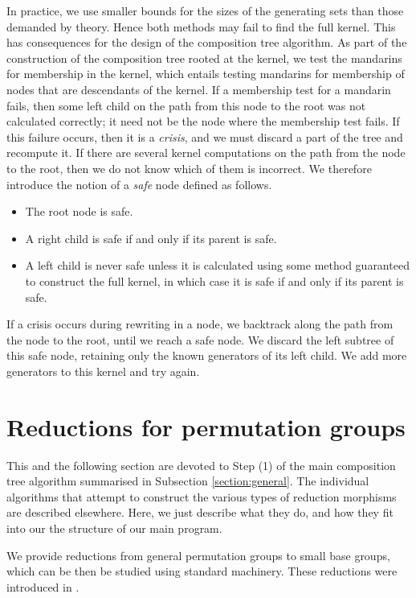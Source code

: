 \documentclass[12pt,twoside,reqno,psamsfonts]{amsproc}
\newcommand{\comment}[1]{\marginpar{\begin{center}\scriptsize{#1}\end{center}}}
\numberwithin{equation}{section}
\numberwithin{figure}{section}
\newcounter{algorithm}
\theoremstyle{plain}
\theoremstyle{definition}
\theoremstyle{remark}
\begin{document}
In practice, we use smaller bounds for the sizes of the 
generating sets than those demanded by theory. 
Hence both methods may fail to find the full kernel. This has
consequences for the design of the composition tree algorithm.
As part of the construction of the composition
tree rooted at the kernel, we test the mandarins for membership in the kernel, 
which entails testing mandarins for membership of nodes that
are descendants of the kernel.
If a membership test for a mandarin fails, 
then some left child on the path from this node to the root was
not calculated correctly; it need not be the 
node where the membership test fails.
If this failure occurs, then it is a \emph{crisis},
and we must discard a part of the tree and recompute it.
If there are several kernel computations on the path from the node
to the root, then we do not know which of them is incorrect. We
therefore introduce the notion of a \emph{safe} node defined as follows.
\begin{itemize}
\item The root node is safe.
\item A right child is safe if and only if its parent is safe.
\item A left child is never safe unless it is calculated using some
  method guaranteed to construct the full kernel, in which case it is safe if and only if its parent is safe.
\end{itemize}
If a crisis occurs during rewriting in a node, we 
backtrack along the path from the node to the root, until we reach a
safe node. We discard the left subtree of this safe node, 
retaining only the known generators of its left child. We add more
generators to this kernel and try again.

\section{Reductions for permutation groups}
\label{section:perm_reductions}
This and the following section are devoted to Step (1) of the main composition
\comment{DFH: added paragraph}
tree algorithm summarised in Subsection \ref{section:general}.
The individual algorithms that attempt to construct the various types of
reduction morphisms are described elsewhere. Here, we just describe
what they do, and how they fit into our the structure of our main program.

We provide reductions from general permutation
groups to small base groups, which can be then be studied 
using standard machinery. These reductions were introduced  
in \cite{MR2289128}.  
\end{document}
